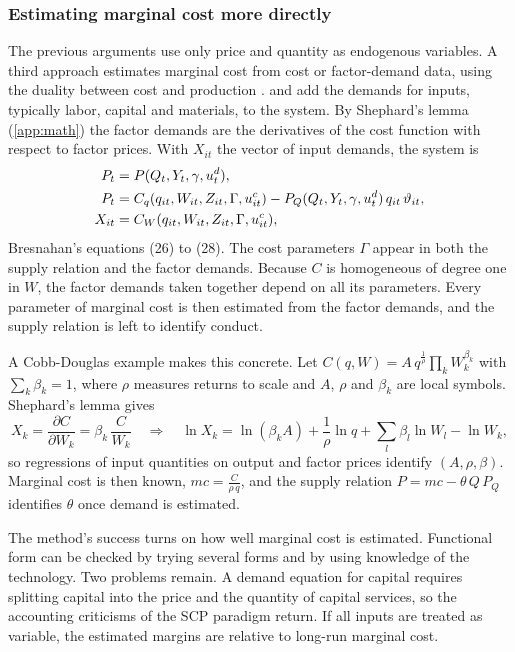 \subsubsection{Estimating marginal cost more directly}\label{sec:01-id-factor}

The previous arguments use only price and quantity as endogenous variables. A third approach estimates marginal cost
from cost or factor-demand data, using the duality between cost and production \citep[Section~3.3]{Bresnahan1989}.
\citet{GollopRoberts1979} and \citet{Appelbaum1979,Appelbaum1982} add the demands for inputs, typically labor, capital
and materials, to the system. By Shephard's lemma (\cref{app:math}) the factor demands are the derivatives of the cost
function with respect to factor prices. With $X_{it}$ the vector of input demands, the system is
\begin{align}
P_t &= P(Q_t, Y_t, \gamma, u^d_t), \notag\\
P_t &= C_q(q_{it}, W_{it}, Z_{it}, \Gamma, u^c_{it}) - P_Q(Q_t, Y_t, \gamma, u^d_t)\, q_{it}\,\vartheta_{it},
  \label{eq:01-factor-system}\\
X_{it} &= C_W(q_{it}, W_{it}, Z_{it}, \Gamma, u^c_{it}), \notag
\end{align}
Bresnahan's equations (26) to (28). The cost parameters $\Gamma$ appear in both the supply relation and the factor
demands. Because $C$ is homogeneous of degree one in $W$, the factor demands taken together depend on all its parameters.
Every parameter of marginal cost is then estimated from the factor demands, and the supply relation is left to identify
conduct.

A Cobb-Douglas example makes this concrete. Let $C(q, W) = A\, q^{\frac{1}{\rho}}\prod_k W_k^{\beta_k}$ with
$\sum_k \beta_k = 1$, where $\rho$ measures returns to scale and $A$, $\rho$ and $\beta_k$ are local symbols. Shephard's
lemma gives
\begin{equation*}
X_k = \frac{\partial C}{\partial W_k} = \beta_k\,\frac{C}{W_k}
\quad\Longrightarrow\quad
\ln X_k = \ln(\beta_k A) + \frac{1}{\rho}\ln q + \sum_l \beta_l \ln W_l - \ln W_k ,
\end{equation*}
so regressions of input quantities on output and factor prices identify $(A, \rho, \beta)$. Marginal cost is then known,
$mc = \frac{C}{\rho\, q}$, and the supply relation $P = mc - \theta\,Q\,P_Q$ identifies $\theta$ once demand is
estimated.

The method's success turns on how well marginal cost is estimated. Functional form can be checked by trying several
forms and by using knowledge of the technology. Two problems remain. A demand equation for capital requires splitting
capital into the price and the quantity of capital services, so the accounting criticisms of the SCP paradigm return.
If all inputs are treated as variable, the estimated margins are relative to long-run marginal cost.

